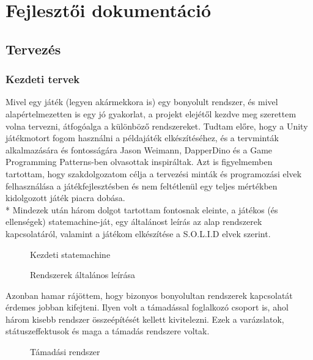 \chapter{Fejlesztői dokumentáció} %
\label{ch:impl}

\section{Tervezés}

\subsection{Kezdeti tervek}
Mivel egy játék (legyen akármekkora is) egy bonyolult rendszer, és mivel alapértelmezetten is egy jó gyakorlat, a projekt elejétől kezdve meg szerettem volna tervezni, átfogóalga a különböző rendszereket. Tudtam előre, hogy a Unity játékmotort fogom használni a példajáték elkészítéséhez, és a tervminták alkalmazására és fontosságára Jason Weimann\cite{jason}, DapperDino\cite{dapperDino} és a Game Programming Patterns-ben\cite{gameProgrammingPatterns} olvasottak inspiráltak. Azt is figyelmemben tartottam, hogy szakdolgozatom célja a tervezési minták és programozási elvek felhasználása a játékfejlesztésben és nem feltétlenül egy teljes mértékben kidolgozott játék piacra dobása.\\*
Mindezek után három dolgot tartottam fontosnak eleinte, a játékos (és ellenségek) statemachine-ját, egy általánost leírás az alap rendszerek kapcsolatáról, valamint a játékom elkészítése a S.O.L.I.D elvek szerint.
\begin{figure}[H]
	\noindent{}
	\caption{Kezdeti statemachine}
	\label{statemachine}
\end{figure}

\begin{figure}[H]
	\noindent{}
	\caption{Rendszerek általános leírása}
	\label{statussys}
\end{figure}

Azonban hamar rájöttem, hogy bizonyos bonyolultan rendszerek kapcsolatát érdemes jobban kifejteni. Ilyen volt a támadással foglalkozó csoport is, ahol három kisebb rendszer összeépítését kellett kivitelezni. Ezek a varázslatok, státuszeffektusok és maga a támadás rendszere voltak.

\begin{figure}[H]
	\noindent{}
	\caption{Támadási rendszer}
	\label{all}
\end{figure}

